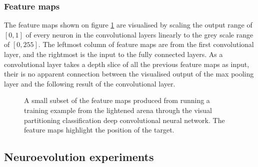 






\subsubsection{Feature maps}
The feature maps shown on figure \ref{fig:featuremaps} are visualised by scaling the output range of $[0,1]$ of every neuron in the convolutional layers linearly to the grey scale range of $[0,255]$. The leftmost column of feature maps are from the first convolutional layer, and the rightmost is the input to the fully connected layers. As a convolutional layer takes a depth slice of all the previous feature maps as input, their is no apparent connection between the visualised output of the max pooling layer and the following result of the convolutional layer.

\begin{figure}[H]
	\begin{scriptsize}
		\sffamily
		\def\svgwidth{\textwidth}
		
	\end{scriptsize}
	\caption[Feature maps]{A small subset of the feature maps produced from running a training example from the lightened arena through the visual partitioning classification deep convolutional neural network. The feature maps highlight the position of the target.}
	\label{fig:featuremaps}
\end{figure}

\subsection{Neuroevolution experiments}


